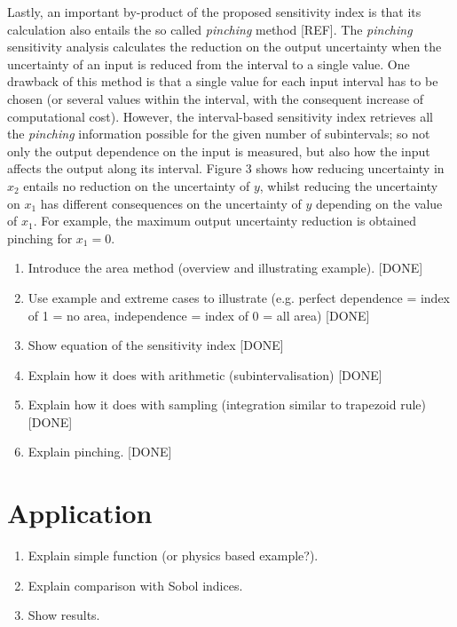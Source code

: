 \documentclass[twocolumn]{rps-esrel2022}
\begin{document}

Lastly, an important by-product of the proposed sensitivity index is that its calculation also entails the so called \textit{pinching} method [REF].
The \textit{pinching} sensitivity analysis calculates the reduction on the output uncertainty when the uncertainty of an input is reduced from the interval to a single value.
One drawback of this method is that a single value for each input interval has to be chosen (or several values within the interval, with the consequent
increase of computational cost).
However, the interval-based sensitivity index retrieves all the \textit{pinching} information possible for the given number of subintervals; so not only the
output dependence on the input is measured, but also how the input affects the output along its interval.
Figure 3 shows how reducing uncertainty in $x_2$ entails no reduction on the uncertainty of $y$, whilst reducing the uncertainty on $x_1$ has different consequences on the
uncertainty of $y$ depending on the value of $x_1$.
For example, the maximum output uncertainty reduction is obtained pinching for $x_1 = 0$.


\begin{enumerate}
	\item Introduce the area method (overview and illustrating example). [DONE]
	\item Use example and extreme cases to illustrate (e.g. perfect dependence = index of 1 = no area, independence = index of 0 = all area) [DONE]
	\item Show equation of the sensitivity index [DONE]
	\item Explain how it does with arithmetic (subintervalisation) [DONE]
	\item Explain how it does with sampling (integration similar to trapezoid rule) [DONE]
	\item Explain pinching. [DONE]
\end{enumerate}

\section{Application}

\begin{enumerate}
	\item Explain simple function (or physics based example?).
	\item Explain comparison with Sobol indices.
	\item Show results.
\end{enumerate}
\end{document}
